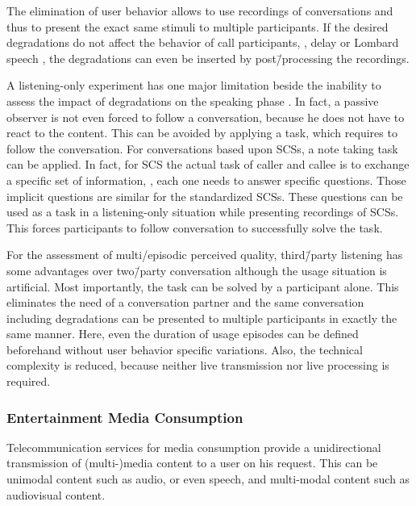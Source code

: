 The elimination of user behavior allows to use recordings of conversations and thus to present the exact same stimuli to multiple participants.
If the desired degradations do not affect the behavior of call participants, \eg, delay or Lombard speech \citep[][p.\,161]{moller_assessment_2000}, the degradations can even be inserted by post\=/processing the recordings.

A listening-only experiment has one major limitation beside the inability to assess the impact of degradations on the speaking phase \citep{gueguin_evaluation_2008}.
In fact, a passive observer is not even forced to follow a conversation, because he does not have to react to the content.
This can be avoided by applying a task, which requires to follow the conversation.
For conversations based upon \acp{SCS}, a note taking task can be applied.
In fact, for \ac{SCS} the actual task of caller and callee is to exchange a specific set of information, \ie, each one needs to answer specific questions.
Those implicit questions are similar for the standardized \acp{SCS}.
These questions can be used as a task in a listening-only situation while presenting recordings of \acp{SCS}.
This forces participants to follow conversation to successfully solve the task.

For the assessment of multi\-/episodic perceived quality, third\=/party listening has some advantages over two\=/party conversation although the usage situation is artificial.
Most importantly, the task can be solved by a participant alone.
This eliminates the need of a conversation partner and the same conversation including degradations can be presented to multiple participants in exactly the same manner.
Here, even the duration of usage episodes can be defined beforehand without user behavior specific variations.
Also, the technical complexity is reduced, because neither live transmission nor live processing is required.

\subsubsection*{Entertainment Media Consumption}
Telecommunication services for media consumption provide a unidirectional transmission of (multi-)media content to a user on his request.
This can be unimodal content such as audio, or even speech, and multi-modal content such as audiovisual content.

